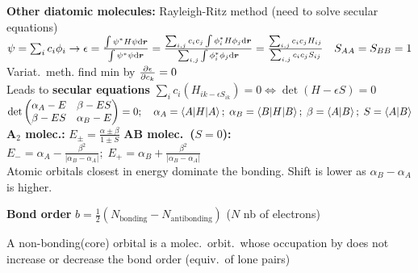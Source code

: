\begin{squishlist}
    \item \textbf{Other diatomic molecules:} Rayleigh-Ritz method (need to solve secular equations)\\
    $\psi = \sum_i c_i \phi_i \rightarrow \epsilon = \frac{\int \psi^* H \psi \textrm{d} \bm{r}}{\int \psi^* \psi \textrm{d} \bm{r}} = \frac{\sum_{i,j}c_ic_j \int \phi_i^* H \phi_j \textrm{d} \bm{r}}{\sum_{i,j}\int \phi_i^* \phi_j \textrm{d} \bm{r}} = \frac{\sum_{i,j}c_i c_j H_{ij}}{\sum_{i,j}c_i c_j S_{ij}} \quad S_{AA} = S_{BB} = 1$\\
    Variat.\ meth.\: find min by $\frac{\partial \epsilon}{\partial c_k} = 0$ \\
    Leads to \textbf{secular equations} $\sum_i c_i (H_{ik - \epsilon S_{ik}}) = 0 \Longleftrightarrow \det(H - \epsilon S) = 0$\\
    $\det \begin{pmatrix}
        \alpha_A - E & \beta - ES \\
        \beta - ES   & \alpha_B - E
    \end{pmatrix} = 0; \quad \alpha_A = \braket{A|H|A};\; \alpha_B = \braket{B|H|B};\; \beta = \braket{A|B};\; S = \braket{A|B}$ \\
    \textbf{A$_2$ molec.:} $E_{\pm} = \frac{\alpha \pm \beta}{1\pm S}$ \qquad
    \textbf{AB molec.\ ($S=0$):} $E_- = \alpha_A - \frac{\beta^2}{|\alpha_B - \alpha_A|};\; E_+ = \alpha_B + \frac{\beta^2}{|\alpha_B - \alpha_A|}$  \\Atomic orbitals closest in energy dominate the bonding. Shift is lower as $\alpha_B - \alpha_A$ is higher.

    \squishline

    \item \textbf{Bond order} $b = \frac{1}{2} (N_{\text{bonding}} - N_{\text{antibonding}})$ ($N$ nb of electrons)
    \item A non-bonding(core) orbital is a molec.\ orbit.\ whose occupation by \elec does not increase or decrease the bond order (equiv.\ of lone pairs)
    

\end{squishlist}
